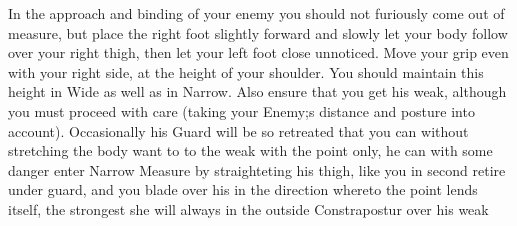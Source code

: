 \newpage


\newpage


%


In the approach and binding of your enemy you should not furiously
come out of measure, but place the right foot slightly forward and
slowly let your body follow over your right thigh, then let your left
foot close unnoticed. Move your grip even with your right side, at the
height of your shoulder. You should maintain this height in Wide as
well as in Narrow. Also ensure that you get his weak, although you
must proceed with care (taking your Enemy;s distance and posture into
account). Occasionally his Guard will be so retreated that you can without
stretching the body want to to the weak with the point only, he can
with some danger enter Narrow Measure by straighteting his thigh, like
you in second retire under guard, and you blade over his in the
direction whereto the point lends itself, the strongest  she will
always in the outside Constrapostur over his weak